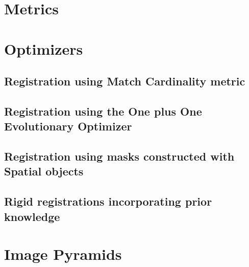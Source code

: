 \clearpage

\section{Metrics}
\label{sec:Metrics}
\ifitkFullVersion

\fi

\clearpage

\section{Optimizers}
\label{sec:Optimizers}
\ifitkFullVersion

\fi



\subsection{Registration using Match Cardinality metric}
\label{sec:RegistrationMatchCardinality}
\ifitkFullVersion

\fi


\subsection{Registration using the One plus One Evolutionary Optimizer}
\label{sec:RegistrationOnePlusOne}
\ifitkFullVersion

\fi



\subsection{Registration using masks constructed with Spatial objects}
\label{sec:RegistrationSpatialObjects}
\ifitkFullVersion

\fi



\subsection{Rigid registrations incorporating prior knowledge}
\label{sec:RegistrationCentered2DTransform}
\ifitkFullVersion

\fi


\clearpage


\section{Image Pyramids}
\label{sec:ImagePyramids}
\ifitkFullVersion

\fi


